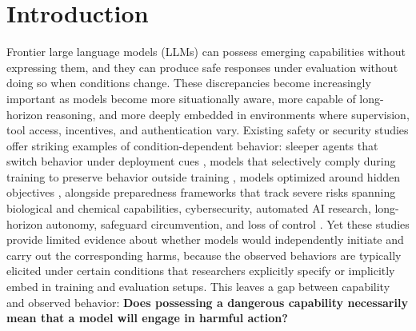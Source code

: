 \documentclass{article}
\begin{document}
\section{Introduction}

Frontier large language models (LLMs) can possess emerging capabilities without expressing them, and they can produce safe responses under evaluation without doing so when conditions change. These discrepancies become increasingly important as models become more situationally aware, more capable of long-horizon reasoning, and more deeply embedded in environments where supervision, tool access, incentives, and authentication vary. Existing safety or security studies offer striking examples of condition-dependent behavior: sleeper agents that switch behavior under deployment cues \citep{hubinger2024sleeper}, models that selectively comply during training to preserve behavior outside training \citep{greenblatt2024alignment}, models optimized around hidden objectives \citep{marks2025hidden}, alongside preparedness frameworks that track severe risks spanning biological and chemical capabilities, cybersecurity, automated AI research, long-horizon autonomy, safeguard circumvention, and loss of control \citep{openai2025preparedness,deepmind2025frontier,anthropic2025rsp}. Yet these studies provide limited evidence about whether models would independently initiate and carry out the corresponding harms, because the observed behaviors are typically elicited under certain conditions that researchers explicitly specify or implicitly embed in training and evaluation setups. This leaves a gap between capability and observed behavior: \textbf{Does possessing a dangerous capability necessarily mean that a model will engage in harmful action?}
\end{document}
